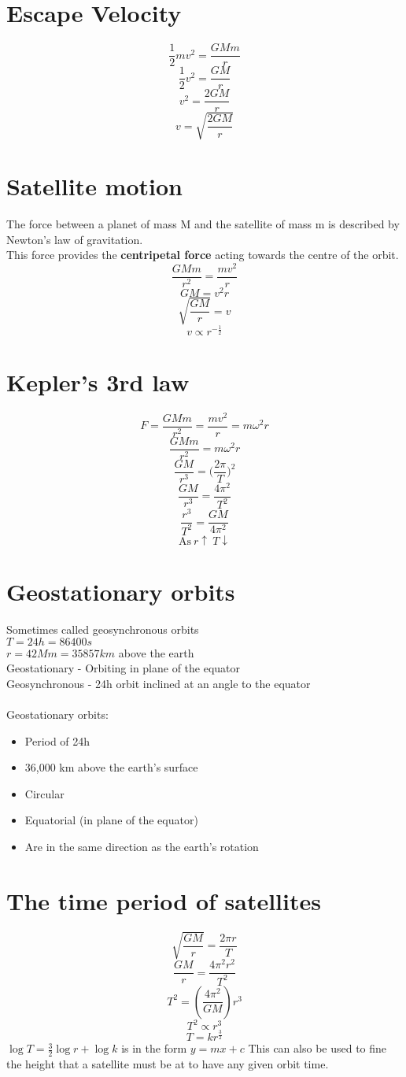 \documentclass{article}[18pt]
\begin{document}
\section{Escape Velocity}
$$\frac{1}{2}mv^2=\frac{GMm}{r}$$
$$\frac{1}{2}v^2=\frac{GM}{r}$$
$$v^2=\frac{2GM}{r}$$
$$v=\sqrt{\frac{2GM}{r}}$$
\section{Satellite motion}
The force between a planet of mass M and the satellite of mass m is described by Newton's law of gravitation.\\
This force provides the \textbf{centripetal force} acting towards the centre of the orbit.
$$\frac{GMm}{r^2}=\frac{mv^2}{r}$$
$$GM=v^2r$$
$$\sqrt{\frac{GM}{r}}=v$$
$$v\propto r^{-\frac{1}{2}}$$
\section{Kepler's 3rd law}
$$F=\frac{GMm}{r^2}=\frac{mv^2}{r}=m\omega^2r$$
$$\frac{GMm}{r^2}=m\omega^2r$$
$$\frac{GM}{r^3}=\Big(\frac{2\pi}{T}\Big)^2$$
$$\frac{GM}{r^3}=\frac{4\pi^2}{T^2}$$
$$\frac{r^3}{T^2}=\frac{GM}{4\pi^2}$$
$$\textrm{As}\  r\uparrow \ T\downarrow$$
\section{Geostationary orbits}
Sometimes called geosynchronous orbits\\
$T=24h=86400s$\\
$r=42Mm=35857km$ above the earth\\
Geostationary - Orbiting in plane of the equator\\
Geosynchronous - 24h orbit inclined at an angle to the equator\\
\\
Geostationary orbits:
\begin{itemize}
\item Period of 24h
\item 36,000 km above the earth's surface
\item Circular
\item Equatorial (in plane of the equator)
\item Are in the same direction as the earth's rotation
\end{itemize}
\section{The time period of satellites}
$$\sqrt{\frac{GM}{r}}=\frac{2\pi r}{T}$$
$$\frac{GM}{r}=\frac{4\pi^2r^2}{T^2}$$
$$T^2=(\frac{4\pi^2}{GM})r^3$$
$$T^2\propto r^3$$
$$T=kr^{\frac{3}{2}}$$
$\log T=\frac{3}{2}\log r+\log k$ is in the form $y=mx+c$
This can also be used to fine the height that a satellite must be at to have any given orbit time.
\end{document}
